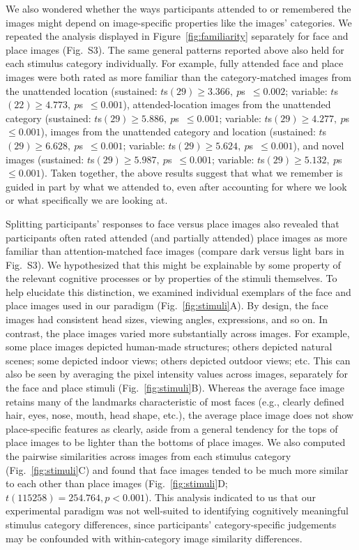 \documentclass[english]{article}
\newcommand{\ratingsByCategory}{S3}
\begin{document}
We also wondered whether the ways participants attended to or remembered the
images might depend on image-specific properties like the images' categories.
We repeated the analysis displayed in Figure~\ref{fig:familiarity} separately
for face and place images (Fig.~\ratingsByCategory). The same general patterns
reported above also held for each stimulus category individually. For example,
fully attended face and place images were both rated as more familiar than the
category-matched images from the unattended location (sustained: $t$s$(29) \geq
3.366,~p$s~$\leq 0.002$; variable: $t$s$(22) \geq 4.773,~p$s~$\leq 0.001$),
attended-location images from the unattended category (sustained: $t$s$(29)
\geq 5.886,~p$s~$\leq 0.001$; variable: $t$s$(29) \geq 4.277,~p$s~$\leq
0.001$), images from the unattended category and location (sustained: $t$s$(29)
\geq 6.628,~p$s~$\leq 0.001$; variable: $t$s$(29) \geq 5.624,~p$s~$\leq
0.001$), and novel images (sustained: $t$s$(29) \geq 5.987,~p$s~$\leq 0.001$;
variable: $t$s$(29) \geq 5.132,~p$s~$\leq 0.001$). Taken together, the above
results suggest that what we remember is guided in part by what we attended to,
even after accounting for where we look or what specifically we are looking at.

Splitting participants' responses to face versus place images also revealed
that participants often rated attended (and partially attended) place images as
more familiar than attention-matched face images (compare dark versus light
bars in Fig.~\ratingsByCategory). We hypothesized that this might be
explainable by some property of the relevant cognitive processes or by
properties of the stimuli themselves. To help elucidate this distinction, we
examined individual exemplars of the face and place images used in our paradigm
(Fig.~\ref{fig:stimuli}A). By design, the face images had consistent head
sizes, viewing angles, expressions, and so on. In contrast, the place images
varied more substantially across images. For example, some place images
depicted human-made structures; others depicted natural scenes; some depicted
indoor views; others depicted outdoor views; etc. This can also be seen by
averaging the pixel intensity values across images, separately for the face and
place stimuli (Fig.~\ref{fig:stimuli}B). Whereas the average face image retains
many of the landmarks characteristic of most faces (e.g., clearly defined hair,
eyes, nose, mouth, head shape, etc.), the average place image does not show
place-specific features as clearly, aside from a general tendency for the tops
of place images to be lighter than the bottoms of place images. We also
computed the pairwise similarities across images from each stimulus category
(Fig.~\ref{fig:stimuli}C) and found that face images tended to be much more
similar to each other than place images (Fig.~\ref{fig:stimuli}D; $t(115258) =
254.764, p < 0.001$). This analysis indicated to us that our experimental
paradigm was not well-suited to identifying cognitively meaningful stimulus
category differences, since participants' category-specific judgements may be
confounded with within-category image similarity differences.
\end{document}
